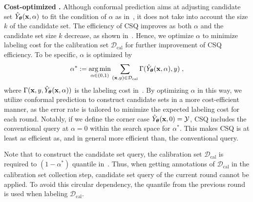 \noindent\textbf{Cost-optimized .} \label{sec:optimize}
Although conformal prediction aims at adjusting candidate set $\hat{Y}_{\boldsymbol{\theta}}(\mathbf{x}, \alpha)$ to fit the condition of $\alpha$ as in~, it does not take into account the size $k$ of the candidate set.
The efficiency of CSQ improves as both $\alpha$ and the candidate set size $k$ decrease, as shown in~. 
Hence, we optimize $\alpha$ to minimize labeling cost for the calibration set $\mathcal{D}_{\text{cal}}$
for further improvement of CSQ efficiency. 
To be specific, $\alpha$ is optimized by
\begin{equation}
    \alpha^* := \operatorname*{arg\,min}_{\alpha \in (0,1)}{\sum_{(\mathbf{x},y)\in \mathcal D_\text{cal}}{\Gamma(\hat{Y}_{\boldsymbol{\theta}}(\mathbf{x}, \alpha),y)}}\;,
    \label{eq:optimize}
\end{equation}
where $\Gamma(\mathbf{x}, y, \hat{Y}_{\boldsymbol{\theta}}(\mathbf{x}, \alpha))$ is the labeling cost in~.
By optimizing $\alpha$ in this way, we utilize conformal prediction to construct candidate sets in a more cost-efficient manner, as the error rate is tailored to minimize the expected labeling cost for each round.
Notably, if we define the corner case $\hat{Y}_{\boldsymbol{\theta}}(\mathbf{x}, 0) = \mathcal{Y}$, CSQ includes the conventional query at $\alpha = 0$ within the search space for $\alpha^*$.
This makes CSQ is at least as efficient as, and in general more efficient than, the conventional query.

Note that to construct the candidate set query, the calibration set $\mathcal{D}_\text{cal}$ is required to  $(1-\alpha^*)$ quantile in~.
Thus, when getting annotations of $\mathcal{D}_\text{cal}$ in the calibration set collection step, candidate set query of the current round cannot be applied.
To avoid this circular dependency, the quantile from the previous round is used when labeling $\mathcal{D}_\text{cal}$.

